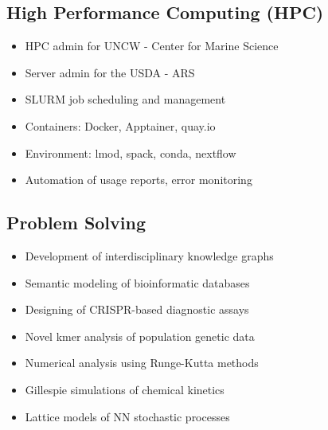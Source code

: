 \begin{multicols}{2}
\subsection{High Performance Computing (HPC)}
\begin{itemize}
\item{HPC admin for UNCW - Center for Marine Science}
\item{Server admin for the USDA - ARS}
\item{SLURM job scheduling and management}
\item{Containers: Docker, Apptainer, quay.io}
\item{Environment: lmod, spack, conda, nextflow}
\item{Automation of usage reports, error monitoring}
\end{itemize}

\columnbreak
\subsection{Problem Solving}
\begin{itemize}
\item{Development of interdisciplinary knowledge graphs}
\item{Semantic modeling of bioinformatic databases}
\item{Designing of CRISPR-based diagnostic assays}
\item{Novel kmer analysis of population genetic data}
\item{Numerical analysis using Runge-Kutta methods}
\item{Gillespie simulations of chemical kinetics}
\item{Lattice models of NN stochastic processes}
\end{itemize}


\end{multicols}
